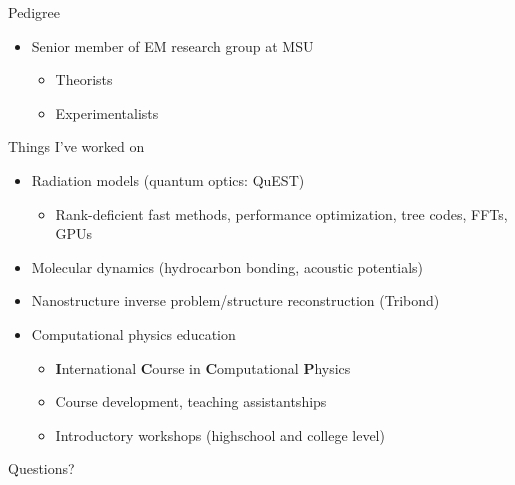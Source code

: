 \documentclass[aspectratio=169, usenames, dvipsnames]{beamer}
\begin{document}
\begin{frame}{Pedigree}
  \begin{itemize}
    \item Senior member of EM research group at MSU
      \begin{itemize}
        \item Theorists
        \item Experimentalists
      \end{itemize}
  \end{itemize}
\end{frame}

\begin{frame}{Things I've worked on}
  \begin{itemize}
    \item Radiation models (quantum optics: QuEST)
      \begin{itemize}
        \item Rank-deficient fast methods, performance optimization, tree codes, FFTs, GPUs
      \end{itemize}
    \item Molecular dynamics (hydrocarbon bonding, acoustic potentials)
    \item Nanostructure inverse problem/structure reconstruction (Tribond)
    \item Computational physics education
      \begin{itemize}
        \item \textbf{I}nternational \textbf{C}ourse in \textbf{C}omputational \textbf{P}hysics
        \item Course development, teaching assistantships
        \item Introductory workshops (highschool and college level)
      \end{itemize}
  \end{itemize}
\end{frame}
\appendix

\begin{frame}[standout]
  Questions?
\end{frame}
\end{document}
